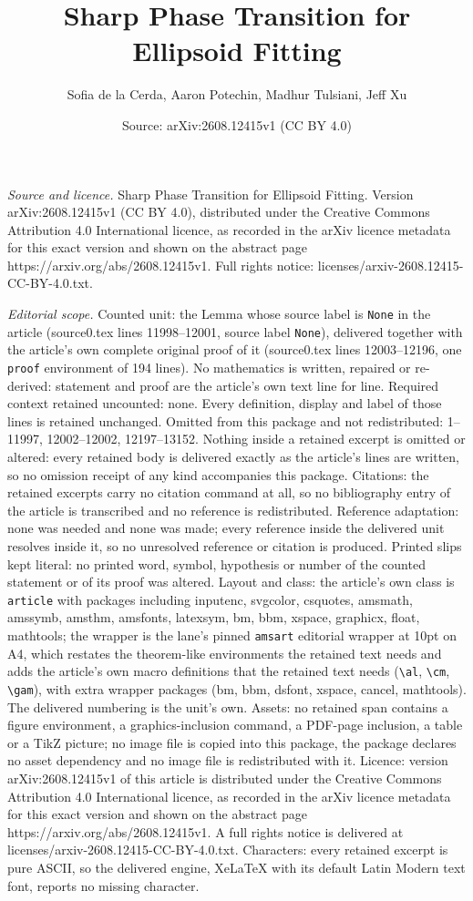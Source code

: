 \documentclass[10pt,a4paper]{amsart}
\title[Sharp Phase Transition for Ellipsoid Fitting]{Sharp Phase Transition for Ellipsoid Fitting}
\author{Sofia de la Cerda, Aaron Potechin, Madhur Tulsiani, Jeff Xu}
\date{Source: arXiv:2608.12415v1 (CC BY 4.0)}
\begin{document}
\maketitle

\noindent\emph{Source and licence.} Sharp Phase Transition for Ellipsoid Fitting. Version arXiv:2608.12415v1 (CC BY 4.0), distributed under the Creative Commons Attribution 4.0 International licence, as recorded in the arXiv licence metadata for this exact version and shown on the abstract page https://arxiv.org/abs/2608.12415v1. Full rights notice: licenses/arxiv-2608.12415-CC-BY-4.0.txt.\par\smallskip

\noindent\textit{Editorial scope.} Counted unit: the Lemma whose source label is \texttt{None} in the article (source0.tex lines 11998--12001, source label \texttt{None}), delivered together with the article's own complete original proof of it (source0.tex lines 12003--12196, one \texttt{proof} environment of 194 lines). No mathematics is written, repaired or re-derived: statement and proof are the article's own text line for line. Required context retained uncounted: none. Every definition, display and label of those lines is retained unchanged. Omitted from this package and not redistributed: 1--11997, 12002--12002, 12197--13152. Nothing inside a retained excerpt is omitted or altered: every retained body is delivered exactly as the article's lines are written, so no omission receipt of any kind accompanies this package. Citations: the retained excerpts carry no citation command at all, so no bibliography entry of the article is transcribed and no reference is redistributed. Reference adaptation: none was needed and none was made; every reference inside the delivered unit resolves inside it, so no unresolved reference or citation is produced. Printed slips kept literal: no printed word, symbol, hypothesis or number of the counted statement or of its proof was altered. Layout and class: the article's own class is \texttt{article} with packages including inputenc, svgcolor, csquotes, amsmath, amssymb, amsthm, amsfonts, latexsym, bm, bbm, xspace, graphicx, float, mathtools; the wrapper is the lane's pinned \texttt{amsart} editorial wrapper at 10pt on A4, which restates the theorem-like environments the retained text needs and adds the article's own macro definitions that the retained text needs (\texttt{\textbackslash al}, \texttt{\textbackslash cm}, \texttt{\textbackslash gam}), with extra wrapper packages (bm, bbm, dsfont, xspace, cancel, mathtools). The delivered numbering is the unit's own. Assets: no retained span contains a figure environment, a graphics-inclusion command, a PDF-page inclusion, a table or a TikZ picture; no image file is copied into this package, the package declares no asset dependency and no image file is redistributed with it. Licence: version arXiv:2608.12415v1 of this article is distributed under the Creative Commons Attribution 4.0 International licence, as recorded in the arXiv licence metadata for this exact version and shown on the abstract page https://arxiv.org/abs/2608.12415v1. A full rights notice is delivered at licenses/arxiv-2608.12415-CC-BY-4.0.txt. Characters: every retained excerpt is pure ASCII, so the delivered engine, XeLaTeX with its default Latin Modern text font, reports no missing character.
\end{document}
